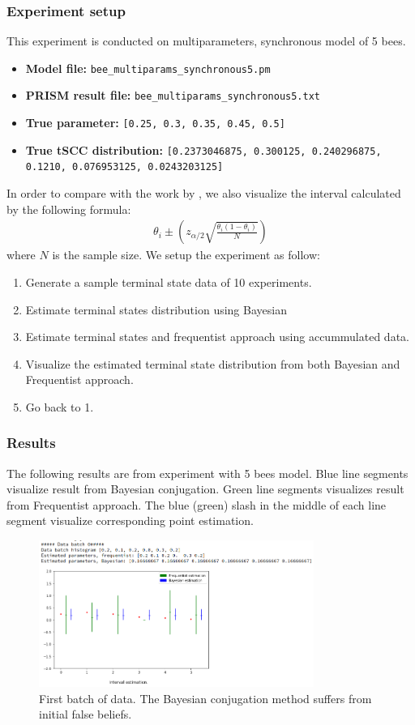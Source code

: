 \documentclass[12pt]{article}
\theoremstyle{definition}
\begin{document}
\subsubsection{Experiment setup}
This experiment is conducted on multiparameters, synchronous model of 5 bees.
\begin{itemize}
\item \textbf{Model file:} \texttt{bee\_multiparams\_synchronous5.pm}
\item \textbf{PRISM result file:} \texttt{bee\_multiparams\_synchronous5.txt}
\item \textbf{True parameter:} \texttt{[0.25, 0.3, 0.35, 0.45, 0.5]}
\item \textbf{True tSCC distribution:} \texttt{[0.2373046875, 0.300125,
    0.240296875, 0.1210, 0.076953125, 0.0243203125]}
\end{itemize}
In order to compare with the work by \cite{hajnal2019data}, we also visualize
the interval calculated by the following formula:
\begin{align*}
  \theta_i \pm (z_{\alpha / 2}\sqrt{\frac{\theta_i(1-\theta_i)}{N}})
\end{align*}
where $N$ is the sample size. We setup the experiment as follow:
\begin{enumerate}
\item Generate a sample terminal state data of 10 experiments.
\item Estimate terminal states distribution using Bayesian
\item Estimate terminal states and frequentist approach using accummulated data.
\item Visualize the estimated terminal state distribution from both Bayesian and
  Frequentist approach.
\item Go back to 1.
\end{enumerate}

\subsubsection{Results}
The following results are from experiment with 5 bees model. Blue line
segments visualize result from Bayesian conjugation. Green line segments
visualizes result from Frequentist approach. The blue (green) slash in the
middle of each line segment visualize corresponding point estimation.
\begin{figure}[H]
  \centering
  \includegraphics[width=0.8\textwidth,keepaspectratio]{figures/ex1_1.png}
  \caption{First batch of data. The Bayesian conjugation method suffers from
    initial false beliefs.}
\end{figure}
\end{document}
